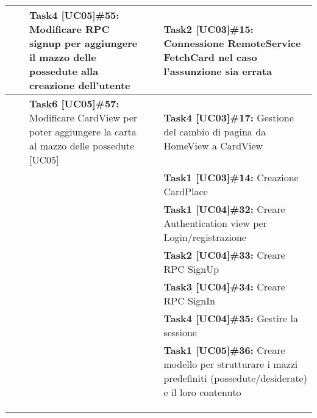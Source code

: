 \documentclass{article}
\begin{document}
\begin{itemize}
\begin{tabular}{ | p{3.5cm} | p{1.5cm} | p{1.5cm} | p{2.6cm} | p{3.1cm} | }
            \hline
            &  & \textbf{Task4 [UC05]\#55:} Modificare RPC signup per aggiungere il mazzo delle possedute alla creazione dell'utente & & \textbf{Task2 [UC03]\#15:} Connessione RemoteService FetchCard nel caso l'assunzione sia errata \\
            \hline
            & & \textbf{Task6 [UC05]\#57:} Modificare CardView per poter aggiungere la carta al mazzo delle possedute [UC05] #57   & & \textbf{Task4 [UC03]\#17:} Gestione del cambio di pagina da HomeView a CardView \\
            \hline
            & &  & & \textbf{Task1 [UC03]\#14:} Creazione CardPlace \\
            \hline
            & &  & & \textbf{Task1 [UC04]\#32:} Creare Authentication view per Login/registrazione \\
            \hline
            & &   & & \textbf{Task2 [UC04]\#33:} Creare RPC SignUp \\
            \hline
            & &   & & \textbf{Task3 [UC04]\#34:} Creare RPC SignIn  \\
            \hline
            & &   & & \textbf{Task4 [UC04]\#35:} Gestire la sessione\\
            \hline
            & &   & & \textbf{Task1 [UC05]\#36:} Creare modello per strutturare i mazzi predefiniti (possedute/desiderate) e il loro contenuto\\
            \hline
            & &   & & \\
            \hline
            & &   & & \\
            \hline
            & & & & \\
            \hline
        \end{tabular}
    \end{itemize}
\end{document}
